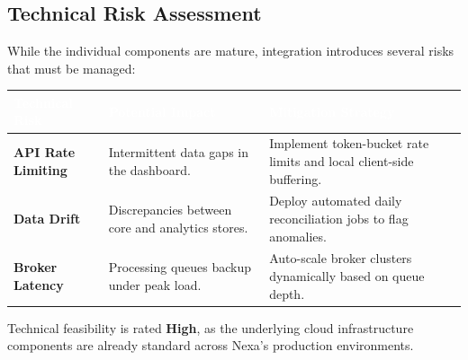 \vspace{1.2em}
\subsection{Technical Risk Assessment}
While the individual components are mature, integration introduces several risks that must be managed:

\vspace{0.8em}
\begin{tabularx}{\textwidth}{@{} >{\bfseries}l X X @{}}
\toprule
\rowcolor{primary}
\textcolor{white}{\textbf{Technical Risk}} & \textcolor{white}{\textbf{Potential Impact}} & \textcolor{white}{\textbf{Mitigation Strategy}} \\
\midrule
API Rate Limiting & Intermittent data gaps in the dashboard. & Implement token-bucket rate limits and local client-side buffering. \\
\midrule
Data Drift & Discrepancies between core and analytics stores. & Deploy automated daily reconciliation jobs to flag anomalies. \\
\midrule
Broker Latency & Processing queues backup under peak load. & Auto-scale broker clusters dynamically based on queue depth. \\
\bottomrule
\end{tabularx}
\vspace{0.8em}

Technical feasibility is rated \textbf{High}, as the underlying cloud infrastructure components are already standard across Nexa's production environments.
